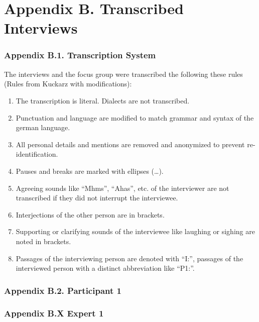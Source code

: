 \documentclass{sigchi}
\begin{document}
\twocolumn
\section{Appendix B. Transcribed Interviews}

\subsubsection{Appendix B.1. Transcription System}
The interviews and the focus group were transcribed the following these rules (Rules from Kuckarz \cite{kuckartz2007} with modifications):
\begin{enumerate}
    \item The transcription is literal. Dialects are not transcribed.
    \item Punctuation and language are modified to match grammar and syntax of the german language.
    \item All personal details and mentions are removed and anonymized to prevent re-identification.
    \item Pauses and breaks are marked with ellipses (\dots).
    \item Agreeing sounds like ``Mhms'', ``Ahas'', etc. of the interviewer are not transcribed if they did not interrupt the interviewee.
    \item Interjections of the other person are in brackets.
    \item Supporting or clarifying sounds of the interviewee like laughing or sighing are noted in brackets.
    \item Passages of the interviewing person are denoted with ``I:'', passages of the interviewed person with a distinct abbreviation like ``P1:''.
\end{enumerate}

\subsubsection{Appendix B.2. Participant 1}



\subsubsection{Appendix B.X Expert 1}


\end{document}
